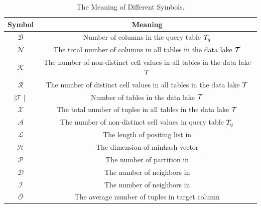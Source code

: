 \begin{table}[!ht]
	\centering
	\caption{The Meaning of Different Symbols.}
	\begin{tabular}{cc}
		\hline
		Symbol & Meaning \\ \hline
		$\mathcal{B}$ & Number of columns in the query table $T_q$  \\
		$\mathcal{N}$ &The total number of columns in all tables in the data lake $\mathcal{T}$ \\
		$\mathcal{K}$ & The number of non-distinct cell values in all tables in the data lake $\mathcal{T}$   \\
		$\mathcal{R}$ &The number of distinct cell values in all tables in the data lake $\mathcal{T}$ \\
		$\mid \mathcal{T} \mid$ & Number of tables in the data lake $\mathcal{T}$  \\
		$\mathcal{X}$ &The total number of tuples in all tables in the data lake $\mathcal{T}$ \\
		$\mathcal{A}$ & The number of non-distinct cell values in query table $T_q$  \\
		
		$\mathcal{L}$ & The length of positing list in \josie  \\
		$\mathcal{H}$ & The dimension of minhash vector \\
		$\mathcal{P}$ & The number of partition in \lsh\\
		$\mathcal{D}$ & The number of neighbors in \dlll\\
		$\mathcal{I}$ & The number of neighbors in \infogather\\
		$\overline{\mathcal{O}}$ & The average number of tuples in target column\\






	
	\end{tabular}
	\label{symbol_table}
\end{table}



